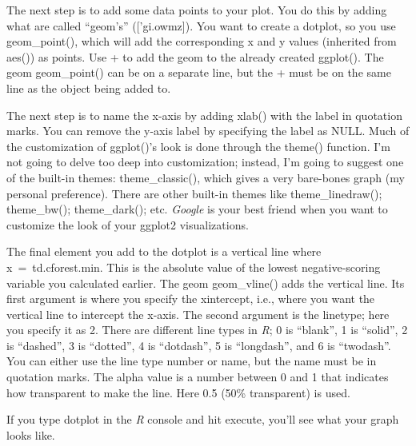 \documentclass[
  10pt,
  letterpaper]{article}
\renewcommand\texttt[1]{{\ttfamily\color{BrickRed}#1}}
\begin{document}
The next step is to add some data points to your plot. You do this by
adding what are called ``geom's'' ({[}'gi.owmz{]}). You want to create a
dotplot, so you use \texttt{geom\_point()}, which will add the
corresponding \texttt{x} and \texttt{y} values (inherited from
\texttt{aes()}) as points. Use \texttt{+} to add the geom to the already
created \texttt{ggplot()}. The geom \texttt{geom\_point()} can be on a
separate line, but the \texttt{+} must be on the same line as the object
being added to.

The next step is to name the \texttt{x}-axis by adding \texttt{xlab()}
with the label in quotation marks. You can remove the \texttt{y}-axis
label by specifying the label as \texttt{NULL}. Much of the
customization of \texttt{ggplot()}'s look is done through the
\texttt{theme()} function. I'm not going to delve too deep into
customization; instead, I'm going to suggest one of the built-in themes:
\texttt{theme\_classic()}, which gives a very bare-bones graph (my
personal preference). There are other built-in themes like
\texttt{theme\_linedraw()}; \texttt{theme\_bw()};
\texttt{theme\_dark()}; etc. \emph{Google} is your best friend when you
want to customize the look of your \texttt{ggplot2} visualizations.

The final element you add to the dotplot is a vertical line where
\texttt{x\ =\ td.cforest.min}. This is the absolute value of the lowest
negative-scoring variable you calculated earlier. The geom
\texttt{geom\_vline()} adds the vertical line. Its first argument is
where you specify the \texttt{xintercept}, i.e., where you want the
vertical line to intercept the \texttt{x}-axis. The second argument is
the \texttt{linetype}; here you specify it as \texttt{2}. There are
different line types in \emph{R}; \texttt{0} is ``blank'', \texttt{1} is
``solid'', \texttt{2} is ``dashed'', \texttt{3} is ``dotted'',
\texttt{4} is ``dotdash'', \texttt{5} is ``longdash'', and \texttt{6} is
``twodash''. You can either use the line type number or name, but the
name must be in quotation marks. The \texttt{alpha} value is a number
between \texttt{0} and \texttt{1} that indicates how transparent to make
the line. Here \texttt{0.5} (50\% transparent) is used.

If you type \texttt{dotplot} in the \emph{R} console and hit execute,
you'll see what your graph looks like.
\end{document}

